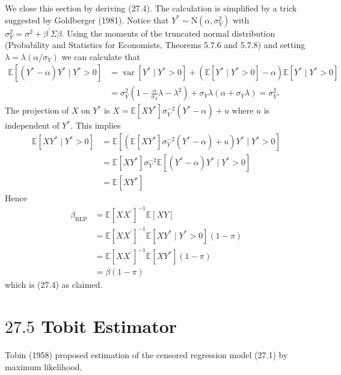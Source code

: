 \documentclass[10pt]{article}
\begin{document}
We close this section by deriving (27.4). The calculation is simplified by a trick suggested by Goldberger (1981). Notice that $Y^{*} \sim \mathrm{N}\left(\alpha, \sigma_{Y}^{2}\right)$ with $\sigma_{Y}^{2}=\sigma^{2}+\beta^{\prime} \Sigma \beta$. Using the moments of the truncated normal distribution (Probability and Statistics for Economists, Theorems 5.7.6 and 5.7.8) and setting $\lambda=\lambda\left(\alpha / \sigma_{Y}\right)$ we can calculate that
$$
\begin{aligned}
\mathbb{E}\left[\left(Y^{*}-\alpha\right) Y^{*} \mid Y^{*}>0\right] &=\operatorname{var}\left[Y^{*} \mid Y^{*}>0\right]+\left(\mathbb{E}\left[Y^{*} \mid Y^{*}>0\right]-\alpha\right) \mathbb{E}\left[Y^{*} \mid Y^{*}>0\right] \\
&=\sigma_{Y}^{2}\left(1-\frac{\alpha}{\sigma_{Y}} \lambda-\lambda^{2}\right)+\sigma_{Y} \lambda\left(\alpha+\sigma_{Y} \lambda\right)=\sigma_{Y}^{2} .
\end{aligned}
$$
The projection of $X$ on $Y^{*}$ is $X=\mathbb{E}\left[X Y^{*}\right] \sigma_{Y}^{-2}\left(Y^{*}-\alpha\right)+u$ where $u$ is independent of $Y^{*}$. This implies
$$
\begin{aligned}
\mathbb{E}\left[X Y^{*} \mid Y^{*}>0\right] &=\mathbb{E}\left[\left(\mathbb{E}\left[X Y^{*}\right] \sigma_{Y}^{-2}\left(Y^{*}-\alpha\right)+u\right) Y^{*} \mid Y^{*}>0\right] \\
&=\mathbb{E}\left[X Y^{*}\right] \sigma_{Y}^{-2} \mathbb{E}\left[\left(Y^{*}-\alpha\right) Y^{*} \mid Y^{*}>0\right] \\
&=\mathbb{E}\left[X Y^{*}\right]
\end{aligned}
$$
Hence
$$
\begin{aligned}
\beta_{\mathrm{BLP}} &=\mathbb{E}\left[X X^{\prime}\right]^{-1} \mathbb{E}[X Y] \\
&=\mathbb{E}\left[X X^{\prime}\right]^{-1} \mathbb{E}\left[X Y^{*} \mid Y^{*}>0\right](1-\pi) \\
&=\mathbb{E}\left[X X^{\prime}\right]^{-1} \mathbb{E}\left[X Y^{*}\right](1-\pi) \\
&=\beta(1-\pi)
\end{aligned}
$$
which is (27.4) as claimed.

\section{$27.5$ Tobit Estimator}
Tobin (1958) proposed estimation of the censored regression model (27.1) by maximum likelihood.
\end{document}
